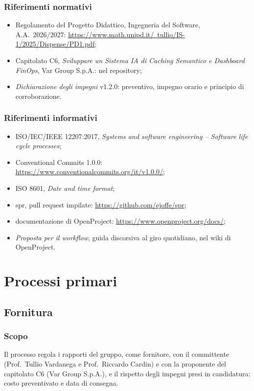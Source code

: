 \documentclass[a4paper, 11pt]{article}
\begin{document}
\subsubsection*{Riferimenti normativi}
\begin{itemize}
    \item Regolamento del Progetto Didattico, Ingegneria del Software, A.A.~2026/2027: \href{https://www.math.unipd.it/~tullio/IS-1/2025/Dispense/PD1.pdf}{https://www.math.unipd.it/~tullio/IS-1/2025/Dispense/PD1.pdf};
    \item Capitolato C6, \emph{Sviluppare un Sistema IA di Caching Semantico e Dashboard FinOps}, Var Group S.p.A.:  nel repository;
    \item \emph{Dichiarazione degli impegni} v1.2.0: preventivo, impegno orario e principio di corroborazione.
\end{itemize}
\subsubsection*{Riferimenti informativi}
\begin{itemize}
    \item ISO/IEC/IEEE 12207:2017, \emph{Systems and software engineering -- Software life cycle processes};
    \item Conventional Commits 1.0.0: \url{https://www.conventionalcommits.org/it/v1.0.0/};
    \item ISO 8601, \emph{Date and time format};
    \item spr, pull request impilate: \url{https://github.com/ejoffe/spr};
    \item documentazione di OpenProject: \url{https://www.openproject.org/docs/};
    \item \emph{Proposta per il workflow}, guida discorsiva al giro quotidiano, nel wiki di OpenProject.
\end{itemize}

\section{Processi primari}

\subsection{Fornitura}
\subsubsection{Scopo}
Il processo regola i rapporti del gruppo, come fornitore, con il committente (Prof.\ Tullio Vardanega e Prof.\ Riccardo Cardin) e con la proponente del capitolato C6 (Var Group S.p.A.), e il rispetto degli impegni presi in candidatura: costo preventivato e data di consegna.
\end{document}
